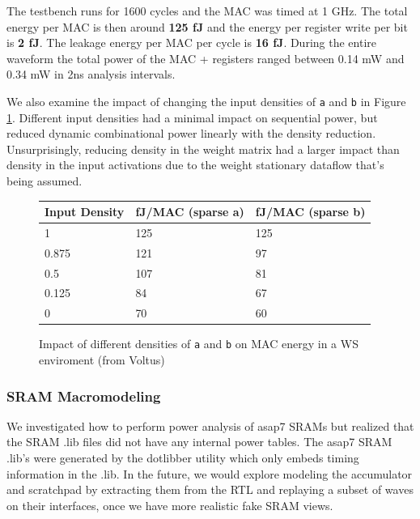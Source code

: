 \documentclass[sigconf]{acmart}
\begin{document}
The testbench runs for 1600 cycles and the MAC was timed at 1 GHz.
The total energy per MAC is then around \textbf{125 fJ} and the energy per register write per bit is \textbf{2 fJ}.
The leakage energy per MAC per cycle is \textbf{16 fJ}.
During the entire waveform the total power of the MAC + registers ranged between 0.14 mW and 0.34 mW in 2ns analysis intervals.

We also examine the impact of changing the input densities of \texttt{a} and \texttt{b} in Figure \ref{fig:density_mac}.
Different input densities had a minimal impact on sequential power, but reduced dynamic combinational power linearly with the density reduction.
Unsurprisingly, reducing density in the weight matrix had a larger impact than density in the input activations due to the weight stationary dataflow that's being assumed.

\begin{figure}
\begin{tabular}{l l l}
  \toprule
  \textbf{Input Density} & \textbf{fJ/MAC (sparse a)} & \textbf{fJ/MAC (sparse b)} \\ \midrule
  1 & 125 & 125 \\
  0.875 & 121 & 97 \\
  0.5 & 107 & 81 \\
  0.125 & 84 & 67 \\
  0 & 70 & 60 \\
  \bottomrule
\end{tabular}
\caption{Impact of different densities of \texttt{a} and \texttt{b} on MAC energy in a WS enviroment (from Voltus)}
\label{fig:density_mac}
\end{figure}

\subsubsection{SRAM Macromodeling}
We investigated how to perform power analysis of asap7 SRAMs but realized that the SRAM .lib files did not have any internal power tables.
The asap7 SRAM .lib's were generated by the dotlibber utility which only embeds timing information in the .lib.
In the future, we would explore modeling the accumulator and scratchpad by extracting them from the RTL and replaying a subset of waves on their interfaces, once we have more realistic fake SRAM views.
\end{document}
